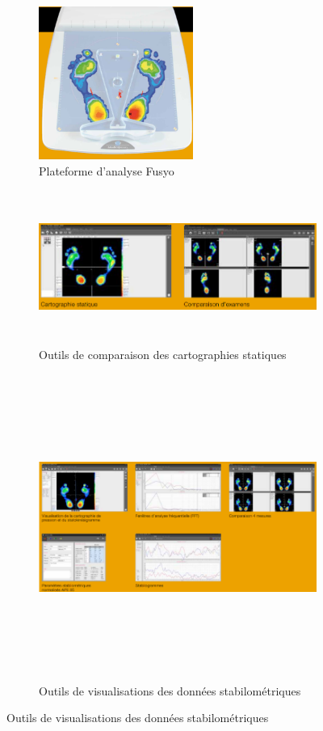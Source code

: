 \begin{figure}[H]
    \centering
    \begin{subfigure}[b]{0.45\textwidth}
      \centering
      \includegraphics[height=5cm]{images/analyse_marche/Fusyo_1.png}
      \caption{Plateforme d'analyse Fusyo}\label{fig:Fusyo_1}
    \end{subfigure}
    \begin{subfigure}[b]{0.5\textwidth}
        \centering
        \includegraphics[height=5cm]{images/analyse_marche/Fusyo_2.png}
        \caption{Outils de comparaison des cartographies statiques}\label{fig:Fusyo_2}
    \end{subfigure}
    \begin{subfigure}[b]{0.5\textwidth}
        \centering  
        \includegraphics[height=10cm]{images/analyse_marche/Fusyo_4.png}
        \caption{Outils de visualisations des données stabilométriques}\label{fig:Fusyo_4}
    \end{subfigure}
\end{figure}

